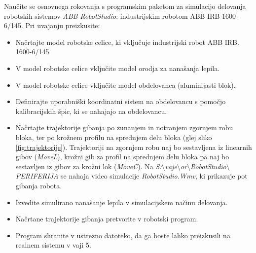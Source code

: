 Naučite se osnovnega rokovanja s programskim paketom za simulacijo delovanja
robotskih sistemov \emph{ABB RobotStudio}: industrijskim robotom ABB IRB
1600-6/145. Pri uvajanju preizkusite:
\begin{itemize}
\item\vspace*{-0.25cm} Načrtajte model robotske celice, ki vključuje industrijski robot ABB IRB.
1600-6/145

\item\vspace*{-0.25cm} V model robotske celice vključite model
orodja za nanašanja lepila.

\item\vspace*{-0.25cm} V model robotske celice vključite model
obdelovanca (aluminijasti blok).

\item\vspace*{-0.25cm} Definirajte uporabniški koordinatni sistem na obdelovancu s pomočjo kalibracijskih špic, ki se nahajajo na obdelovancu.

\item\vspace*{-0.25cm} Načrtajte trajektorije gibanja po zunanjem in notranjem zgornjem robu bloka, ter po krožnem profilu na sprednjem delu bloka (glej sliko \ref{fig:trajektorije}). Trajektoriji na zgornjem robu naj bo sestavljena iz linearnih gibov (\emph{MoveL}), krožni gib za profil na sprednjem delu bloka pa naj bo sestavljen iz gibov za krožni lok (\emph{MoveC}). Na \emph{S:$\setminus$vaje$\setminus$or$\setminus$RobotStudio$\setminus$PERIFERIJA} se nahaja video simulacije \emph{RobotStudio.Wmv}, ki prikazuje pot gibanja robota.

\item\vspace*{-0.25cm} Izvedite simulirano nanašanje lepila v simulacijskem načinu
delovanja.

\item\vspace*{-0.25cm} Načrtane trajektorije gibanja pretvorite v robotski
program.

\item\vspace*{-0.25cm} Program shranite v ustrezno datoteko, da ga boste lahko preizkusili
na realnem sistemu v vaji 5.
\end{itemize}



%

\label{Prazna stran} 
